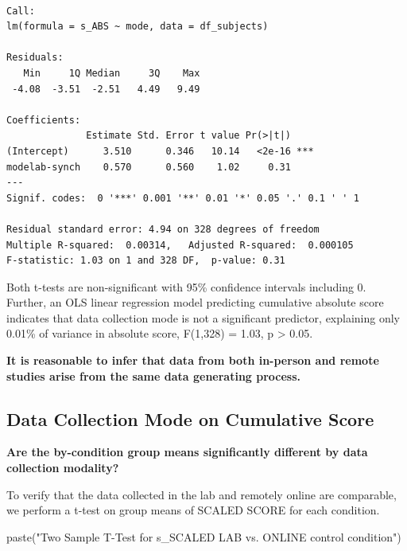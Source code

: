 \documentclass[
  letterpaper,
  DIV=11,
  numbers=noendperiod]{scrreprt}
\newenvironment{Shaded}{\begin{snugshade}}{\end{snugshade}}
\newcommand{\FunctionTok}[1]{\textcolor[rgb]{0.28,0.35,0.67}{#1}}
\newcommand{\NormalTok}[1]{\textcolor[rgb]{0.00,0.23,0.31}{#1}}
\newcommand{\StringTok}[1]{\textcolor[rgb]{0.13,0.47,0.30}{#1}}
\begin{document}
\begin{verbatim}

Call:
lm(formula = s_ABS ~ mode, data = df_subjects)

Residuals:
   Min     1Q Median     3Q    Max 
 -4.08  -3.51  -2.51   4.49   9.49 

Coefficients:
              Estimate Std. Error t value Pr(>|t|)    
(Intercept)      3.510      0.346   10.14   <2e-16 ***
modelab-synch    0.570      0.560    1.02     0.31    
---
Signif. codes:  0 '***' 0.001 '**' 0.01 '*' 0.05 '.' 0.1 ' ' 1

Residual standard error: 4.94 on 328 degrees of freedom
Multiple R-squared:  0.00314,   Adjusted R-squared:  0.000105 
F-statistic: 1.03 on 1 and 328 DF,  p-value: 0.31
\end{verbatim}

Both t-tests are non-significant with 95\% confidence intervals
including 0. Further, an OLS linear regression model predicting
cumulative absolute score indicates that data collection mode is not a
significant predictor, explaining only 0.01\% of variance in absolute
score, F(1,328) = 1.03, p \textgreater{} 0.05.

\begin{tcolorbox}[standard jigsaw,colframe=quarto-callout-color-frame, arc=.35mm, titlerule=0mm, toptitle=1mm, bottomtitle=1mm, rightrule=.15mm, title={Decision}, leftrule=.75mm, toprule=.15mm, bottomrule=.15mm, opacityback=0, colbacktitle=quarto-callout-color!10!white, left=2mm, opacitybacktitle=0.6, coltitle=black, colback=white]
\textbf{It is reasonable to infer that data from both in-person and
remote studies arise from the same data generating process.}
\end{tcolorbox}

\hypertarget{data-collection-mode-on-cumulative-score}{%
\subsection{Data Collection Mode on Cumulative
Score}\label{data-collection-mode-on-cumulative-score}}

\textbf{Are the by-condition group means significantly different by data
collection modality?}

To verify that the data collected in the lab and remotely online are
comparable, we perform a t-test on group means of SCALED SCORE for each
condition.

\begin{Shaded}
\begin{Highlighting}[]
\FunctionTok{paste}\NormalTok{(}\StringTok{"Two Sample T{-}Test for s\_SCALED LAB vs. ONLINE control condition"}\NormalTok{)}
\end{Highlighting}
\end{Shaded}
\end{document}
